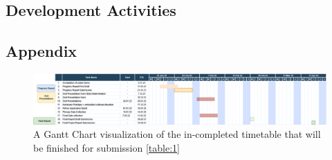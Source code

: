 \documentclass[11pt,letterpaper]{article}
\begin{document}
\newpage
\begin{flushleft}
\justifying






\section{Development Activities}


















\end{flushleft}
\begin{landscape}

\section*{Appendix}

\begin{figure}[htbp]
\centering
\includegraphics[scale=0.4]{Progress_Report/figs/progressreportGantt.png}
\caption{A Gantt Chart visualization of the in-completed timetable that will be finished for submission \ref{table:1}}
\label{fig:Appendix}
\end{figure}
\end{landscape}
\end{document}
